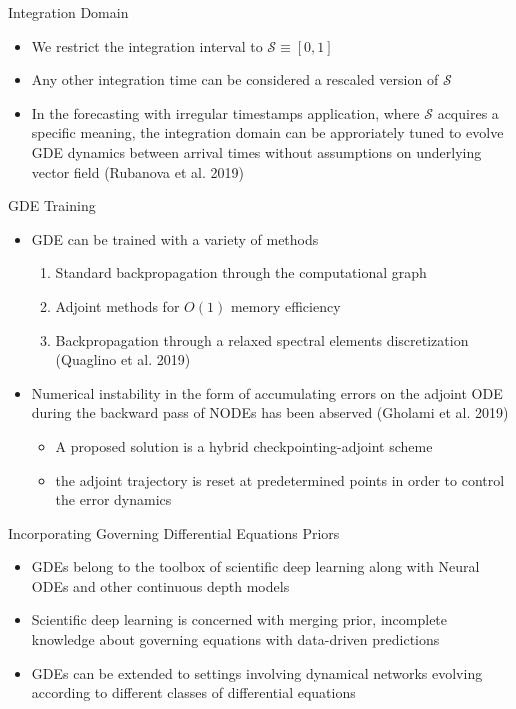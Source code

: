 \documentclass{beamer}
\begin{document}
\begin{frame}{Integration Domain}
\begin{itemize}
\item We restrict the integration interval to $\mathcal S\equiv[0,1]$
\item Any other integration time can be considered a rescaled version of $\mathcal{S}$
\item In the forecasting with irregular timestamps application, where $\mathcal S$ acquires a specific meaning, the integration domain can be approriately tuned to evolve GDE dynamics between arrival times without assumptions on underlying vector field (Rubanova et al. 2019)
\end{itemize}
\end{frame}

\begin{frame}{GDE Training}
\begin{itemize}
\item GDE can be trained with a variety of methods
\begin{enumerate}
\item Standard backpropagation through the computational graph
\item Adjoint methods for $O(1)$ memory efficiency
\item Backpropagation through a relaxed spectral elements discretization (Quaglino et al. 2019)
\end{enumerate}
\item Numerical instability in the form of accumulating errors on the adjoint ODE during the backward pass of NODEs has been abserved (Gholami et al. 2019)
\begin{itemize}
\item A proposed solution is a hybrid checkpointing-adjoint scheme
\item the adjoint trajectory is reset at predetermined points in order to control the error dynamics
\end{itemize}
\end{itemize}
\end{frame}

\begin{frame}{Incorporating Governing Differential Equations Priors}
\begin{itemize}
\item GDEs belong to the toolbox of scientific deep learning along with Neural ODEs and other continuous depth models
\item Scientific deep learning is concerned with merging prior, incomplete knowledge about governing equations with data-driven predictions
\item GDEs can be extended to settings involving dynamical networks evolving according to different classes of differential equations
\end{itemize}
\end{frame}
\end{document}
